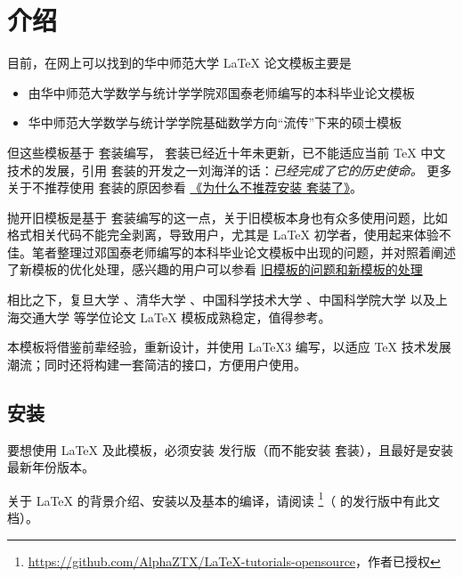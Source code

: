 
\section{介绍} 

目前，在网上可以找到的华中师范大学 \LaTeX{} 论文模板主要是

\begin{itemize}
  \item 由华中师范大学数学与统计学学院邓国泰老师编写的本科毕业论文模板
  \item 华中师范大学数学与统计学学院基础数学方向“流传”下来的硕士模板
\end{itemize}

但这些模板基于 \CTeX 套装编写， \CTeX 套装已经近十年未更新，已不能适应当前 \TeX{} 中文技术的发展，引用 \CTeX 套装的开发之一刘海洋的话：\emph{\CTeX 已经完成了它的历史使命。} 更多关于不推荐使用 \CTeX 套装的原因参看 \href{https://gitee.com/xkwxdyy/CCNUthesis/wikis/%E5%B8%B8%E8%A7%81%E9%97%AE%E9%A2%98FAQ/%E4%B8%BA%E4%BB%80%E4%B9%88%E4%B8%8D%E6%8E%A8%E8%8D%90%E5%AE%89%E8%A3%85\CTeX%E5%A5%97%E8%A3%85%E4%BA%86}{《为什么不推荐安装 \CTeX 套装了》}。

抛开旧模板是基于 \CTeX 套装编写的这一点，关于旧模板本身也有众多使用问题，比如格式相关代码不能完全剥离，导致用户，尤其是 \LaTeX{} 初学者，使用起来体验不佳。笔者整理过邓国泰老师编写的本科毕业论文模板中出现的问题，并对照着阐述了新模板的优化处理，感兴趣的用户可以参看 \href{https://gitee.com/xkwxdyy/CCNUthesis/wikis/%E6%97%A7%E6%A8%A1%E7%89%88%E7%9A%84%E9%97%AE%E9%A2%98%E5%92%8C%E6%96%B0%E6%A8%A1%E7%89%88%E7%9A%84%E5%A4%84%E7%90%86}{旧模板的问题和新模板的处理}

相比之下，复旦大学 、清华大学 、中国科学技术大学 、中国科学院大学  以及上海交通大学  等学位论文 \LaTeX{} 模板成熟稳定，值得参考。

本模板将借鉴前辈经验，重新设计，并使用 \LaTeX3 编写，以适应 \TeX{} 技术发展潮流；同时还将构建一套简洁的接口，方便用户使用。


\subsection{\TeXLive 安装}

要想使用 \LaTeX{} 及此模板，必须安装 \TeXLive 发行版（而不能安装 \CTeX 套装），且最好是安装最新年份版本。

关于 \LaTeX{} 的背景介绍、安装以及基本的编译，请阅读  \footnote{\url{https://github.com/AlphaZTX/LaTeX-tutorials-opensource}，作者已授权}（ 的发行版中有此文档）。


